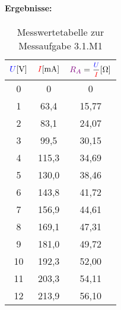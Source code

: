 \documentclass[a4paper,titlepage,parskip]{scrreprt}
\newcommand{\spannung}[1]{\textcolor{blue}{#1}}
\newcommand{\strom}[1]{\textcolor{red}{#1}}
\newcommand{\widerstand}[1]{\textcolor{violet}{#1}}
\begin{document}
              \paragraph{Ergebnisse:}
                   \begin{center}
                        \begin{table}[!hbtp]
                            \caption{Messwertetabelle zur Messaufgabe 3.1.M1}
                            \label{tbl:messergebnisse3.1}
                            \renewcommand{\arraystretch}{1.3}
                            \begin{center}
                                \begin{tabular}{c|cc}
                                    $\spannung{U} [\si{\volt}]$  &
                                    $\strom{I} [\si{\milli\ampere}]$ &
                                    $\widerstand{R_A} = \mfrac{\spannung{U}}{\strom{I}} [\si{\ohm}]$\\ \hline

                                    0 & 0 & 0\\
                                    1 & 63,4 & 15,77\\
                                    2 & 83,1 & 24,07\\
                                    3 & 99,5 & 30,15\\
                                    4 &115,3 & 34,69\\
                                    5 & 130,0 & 38,46\\
                                    6 & 143,8 & 41,72\\
                                    7 & 156,9 & 44,61\\
                                    8 & 169,1 & 47,31\\
                                    9 & 181,0 & 49,72\\
                                    10 & 192,3 & 52,00\\
                                    11 & 203,3 & 54,11\\
                                    12 & 213,9 & 56,10\\
                                \end{tabular}
                            \end{center}
                        \end{table}
                    \end{center}
		 \pagebreak
\end{document}
